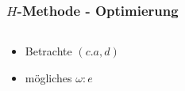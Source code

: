 \begin{frame}
  \frametitle{$H$-Methode - Optimierung}

  \begin{columns}[T] %
    \begin{column}{.3\textwidth}
	    \begin{itemize}
		  \item Betrachte $(c.a,d)$
		  \item mögliches $\omega: e$
	    \end{itemize}
    \end{column}%

    \begin{column}{.70\textwidth}
    \end{column}%
  \end{columns}
\end{frame}


